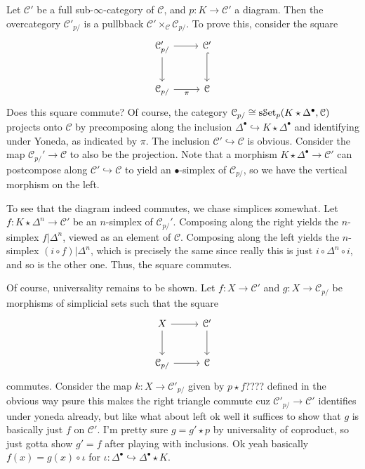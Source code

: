 \begin{remark}
	Let $\mathcal{C} '$ be a full sub-$\infty $-category of $\mathcal{C} $, and $p : K \to \mathcal{C} '$ a diagram. Then the overcategory $\mathcal{C} '_{p/} $ is a pullbback $\mathcal{C} '\times_\mathcal{C} \mathcal{C} _{p/} $. To prove this, consider the square
	\[\begin{tikzcd}[row sep = 2.5em, column sep = 2.5em]
	\mathcal{C} '_{p/} \ar[r] \ar[d]  & \mathcal{C} ' \ar[hook, d]  \\
	\mathcal{C} _{p/} \ar[" \pi  "', r]  & \mathcal{C} 
	\end{tikzcd}\]
	Does this square commute? Of course, the category $\mathcal{C}_{p/} \cong \mathrm{s}\mathcal{S}\mathrm{et} _p(K\star \Delta ^{\bullet},\mathcal{C} )$ projects onto $\mathcal{C} $ by precomposing along the inclusion $\Delta ^{\bullet} \hookrightarrow K\star \Delta ^{\bullet} $ and identifying under Yoneda, as indicated by $\pi $. The inclusion $\mathcal{C} '\hookrightarrow \mathcal{C} $ is obvious. Consider the map $\mathcal{C} _{p/} '\to \mathcal{C} $ to also be the projection. Note that a morphism $K\star \Delta ^{\bullet} \to \mathcal{C}' $ can postcompose along $\mathcal{C} '\hookrightarrow \mathcal{C} $ to yield an $\bullet$-simplex of $\mathcal{C} _{p/} $, so we have the vertical morphism on the left.

	To see that the diagram indeed commutes, we chase simplices somewhat. Let $f : K\star \Delta ^n \to \mathcal{C} '$ be an $n$-simplex of $\mathcal{C} _{p/} '$. Composing along the right yields the $n$-simplex $f|\Delta ^n$, viewed as an element of $\mathcal{C} $. Composing along the left yields the $n$-simplex $(i\circ f)|\Delta ^n$, which is precisely the same since really this is just $i\circ \Delta ^n \circ i$, and so is the other one. Thus, the square commutes.

	Of course, universality remains to be shown. Let $f : X \to \mathcal{C} '$ and $g : X \to \mathcal{C} _{p/} $ be morphisms of simplicial sets such that the square
	\[\begin{tikzcd}[row sep = 2.5em, column sep = 2.5em]
		X\ar[r] \ar[d]  & \mathcal{C} '\ar[d]  \\
	\mathcal{C} _{p/} \ar[r]  & \mathcal{C} 
	\end{tikzcd}\]
	commutes. Consider the map $k : X \to \mathcal{C} '_{p/} $ given by $p \star f$???? defined in the obvious way psure this makes the right triangle commute cuz $\mathcal{C} '_{p/} \to \mathcal{C} '$ identifies under yoneda already, but like what about left ok well it suffices to show that $g$ is basically just $f$ on $\mathcal{C} '$. I'm pretty sure $g=g'\star p$ by universality of coproduct, so just gotta show $g'=f$ after playing with inclusions. Ok yeah basically $f(x)=g(x)\circ \iota $ for $\iota : \Delta ^{\bullet} \hookrightarrow \Delta ^{\bullet} \star K$.
\end{remark}

